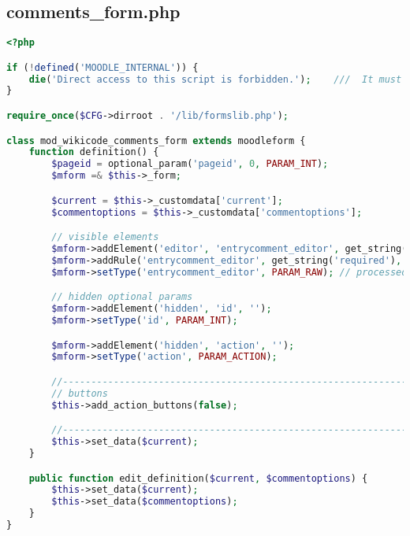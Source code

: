 \subsection{comments\_form.php}
\begin{lstlisting}[language=PHP]
<?php

if (!defined('MOODLE_INTERNAL')) {
    die('Direct access to this script is forbidden.');    ///  It must be included from a Moodle page
}

require_once($CFG->dirroot . '/lib/formslib.php');

class mod_wikicode_comments_form extends moodleform {
    function definition() {
        $pageid = optional_param('pageid', 0, PARAM_INT);
        $mform =& $this->_form;

        $current = $this->_customdata['current'];
        $commentoptions = $this->_customdata['commentoptions'];

        // visible elements
        $mform->addElement('editor', 'entrycomment_editor', get_string('comment', 'glossary'), null, $commentoptions);
        $mform->addRule('entrycomment_editor', get_string('required'), 'required', null, 'client');
        $mform->setType('entrycomment_editor', PARAM_RAW); // processed by trust text or cleaned before the display

        // hidden optional params
        $mform->addElement('hidden', 'id', '');
        $mform->setType('id', PARAM_INT);

        $mform->addElement('hidden', 'action', '');
        $mform->setType('action', PARAM_ACTION);

        //-------------------------------------------------------------------------------
        // buttons
        $this->add_action_buttons(false);

        //-------------------------------------------------------------------------------
        $this->set_data($current);
    }

    public function edit_definition($current, $commentoptions) {
        $this->set_data($current);
        $this->set_data($commentoptions);
    }
}
\end{lstlisting}


